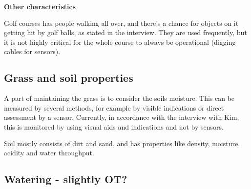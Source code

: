 \textbf{Other characteristics}

Golf courses has people walking all over, and there's a chance for objects on it getting hit by golf balls, as stated in the interview. They are used frequently, but it is not highly critical for the whole course to always be operational (digging cables for sensors). 



\subsection{Grass and soil properties}

A part of maintaining the grass is to consider the soils moisture\cite{golfGrass}. This can be measured by several methods, for example by visible indications or direct assessment by a sensor. Currently, in accordance with the interview with Kim, this is monitored by using visual aids and indications and not by sensors. 

Soil mostly consists of dirt and sand, and has properties like density, moisture, acidity and water throughput.


\subsection{Watering - slightly OT?}
